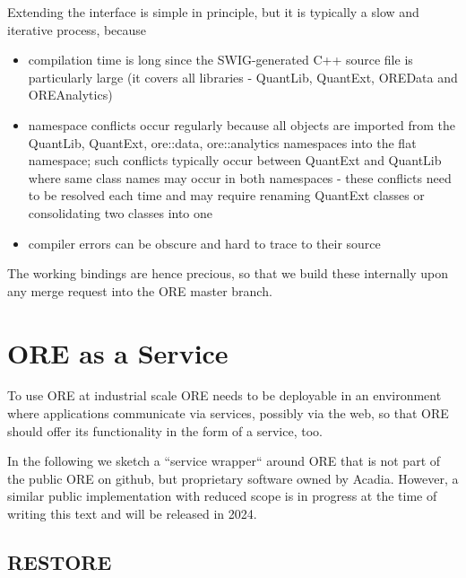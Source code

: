 \documentclass[12pt, a4paper]{report}
\begin{document}
Extending the interface is simple in principle, but it is typically a slow and iterative process, because
\begin{itemize}
\item compilation time is long since the SWIG-generated C++ source file is particularly large (it covers all
  libraries - QuantLib, QuantExt, OREData and OREAnalytics)
\item namespace conflicts occur regularly because all objects are imported from the QuantLib, QuantExt, ore::data,
  ore::analytics namespaces into the flat namespace; such conflicts typically occur between QuantExt and QuantLib where
  same class names may occur in both namespaces - these conflicts need to be resolved each time and may require
  renaming QuantExt classes or consolidating two classes into one
\item compiler errors can be obscure and hard to trace to their source
\end{itemize}

The working bindings are hence precious, so that we build these internally upon any merge request into the ORE
master branch.

\section{ORE as a Service}

To use ORE at industrial scale ORE needs to be deployable in an environment where applications
communicate via services, possibly via the web, so that ORE should offer its functionality in the form of
a service, too.

In the following we sketch a ``service wrapper`` around ORE that is not part of the
public ORE on github, but proprietary software owned by Acadia. However, a similar public
implementation with reduced scope is in progress at the time of writing this text and will be
released in 2024.

\subsection*{RESTORE}
\end{document}
